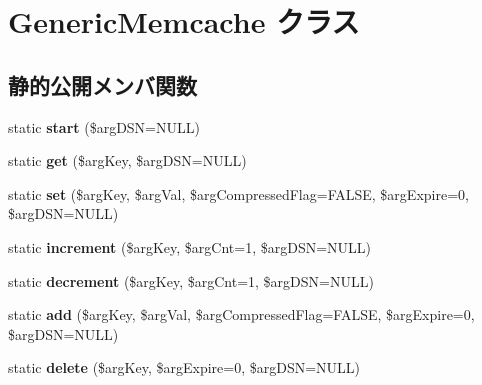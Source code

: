\hypertarget{class_generic_memcache}{}\section{Generic\+Memcache クラス}
\label{class_generic_memcache}
\subsection*{静的公開メンバ関数}
\begin{DoxyCompactItemize}
\item 
\hypertarget{class_generic_memcache_aa3a59906d4626824aa84dc848f50bb42}{}static {\bfseries start} (\$arg\+D\+S\+N=N\+U\+L\+L)\label{class_generic_memcache_aa3a59906d4626824aa84dc848f50bb42}

\item 
\hypertarget{class_generic_memcache_a64918f3a8da97fc81397250d2e2a64f4}{}static {\bfseries get} (\$arg\+Key, \$arg\+D\+S\+N=N\+U\+L\+L)\label{class_generic_memcache_a64918f3a8da97fc81397250d2e2a64f4}

\item 
\hypertarget{class_generic_memcache_a7e51545c4287d51404e4d52561800674}{}static {\bfseries set} (\$arg\+Key, \$arg\+Val, \$arg\+Compressed\+Flag=F\+A\+L\+S\+E, \$arg\+Expire=0, \$arg\+D\+S\+N=N\+U\+L\+L)\label{class_generic_memcache_a7e51545c4287d51404e4d52561800674}

\item 
\hypertarget{class_generic_memcache_abeafe74a10daf89d04acdf5e67f78110}{}static {\bfseries increment} (\$arg\+Key, \$arg\+Cnt=1, \$arg\+D\+S\+N=N\+U\+L\+L)\label{class_generic_memcache_abeafe74a10daf89d04acdf5e67f78110}

\item 
\hypertarget{class_generic_memcache_a9a820425d47856cc9775a4ffc9190c80}{}static {\bfseries decrement} (\$arg\+Key, \$arg\+Cnt=1, \$arg\+D\+S\+N=N\+U\+L\+L)\label{class_generic_memcache_a9a820425d47856cc9775a4ffc9190c80}

\item 
\hypertarget{class_generic_memcache_a9cbd08daac5cc3dcc8e451546782701c}{}static {\bfseries add} (\$arg\+Key, \$arg\+Val, \$arg\+Compressed\+Flag=F\+A\+L\+S\+E, \$arg\+Expire=0, \$arg\+D\+S\+N=N\+U\+L\+L)\label{class_generic_memcache_a9cbd08daac5cc3dcc8e451546782701c}

\item 
\hypertarget{class_generic_memcache_ac2f2a44c256610b093c9b701a243e2d1}{}static {\bfseries delete} (\$arg\+Key, \$arg\+Expire=0, \$arg\+D\+S\+N=N\+U\+L\+L)\label{class_generic_memcache_ac2f2a44c256610b093c9b701a243e2d1}


\end{DoxyCompactItemize}
